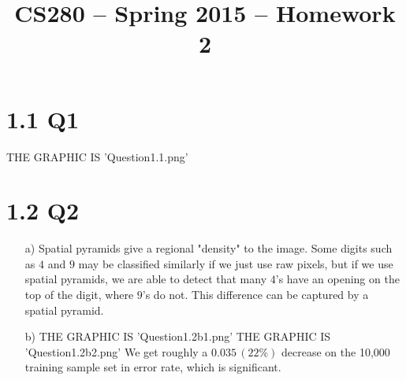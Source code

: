 \documentclass[11pt]{article}
\title{CS280 -- Spring 2015 -- Homework 2}
\author{\Name}
\begin{document}
\maketitle

\section*{1.1 Q1}
THE GRAPHIC IS 'Question1.1.png'
\newpage
\section*{1.2 Q2}
\begin{itemize}
\item[a)]
Spatial pyramids give a regional "density" to the image. Some digits such as $4$ and $9$ may be classified similarly if we just use raw pixels, but if we use spatial pyramids, we are able to detect that many $4$'s have an opening on the top of the digit, where $9$'s do not. This difference can be captured by a spatial pyramid.
\item[b)]
THE GRAPHIC IS 'Question1.2b1.png'
THE GRAPHIC IS 'Question1.2b2.png'
We get roughly a $0.035\,(22\%)$ decrease on the 10,000 training sample set in error rate, which is significant.
\end{itemize}
\newpage


\newpage
\end{document}
